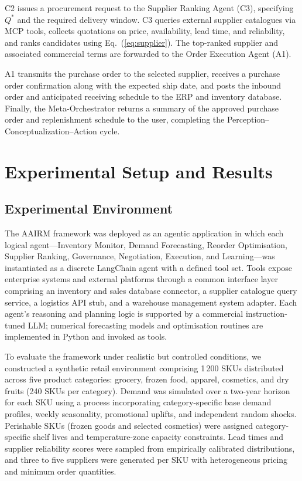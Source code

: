 \documentclass[utf8]{FrontiersinHarvard}
\begin{document}
	C2 issues a procurement request to the Supplier Ranking Agent (C3),
	specifying $Q^*$ and the required delivery window.  C3 queries external
	supplier catalogues via MCP tools, collects quotations on price,
	availability, lead time, and reliability, and ranks candidates using
	Eq.~(\ref{eq:supplier}).  The top-ranked supplier and associated commercial
	terms are forwarded to the Order Execution Agent (A1).

	A1 transmits the purchase order to the selected supplier, receives a
	purchase order confirmation along with the expected ship date, and posts
	the inbound order and anticipated receiving schedule to the ERP and
	inventory database.  Finally, the Meta-Orchestrator returns a summary of
	the approved purchase order and replenishment schedule to the user,
	completing the Perception--Conceptualization--Action cycle.

	\section{Experimental Setup and Results}
	\label{sec:impl}

	\subsection{Experimental Environment}

	The AAIRM framework was deployed as an agentic application in which each
	logical agent---Inventory Monitor, Demand Forecasting, Reorder Optimisation,
	Supplier Ranking, Governance, Negotiation, Execution, and Learning---was
	instantiated as a discrete LangChain agent with a defined tool set.  Tools
	expose enterprise systems and external platforms through a common interface
	layer comprising an inventory and sales database connector, a supplier
	catalogue query service, a logistics API stub, and a warehouse management
	system adapter.  Each agent's reasoning and planning logic is supported by
	a commercial instruction-tuned LLM; numerical forecasting models and
	optimisation routines are implemented in Python and invoked as tools.

	To evaluate the framework under realistic but controlled conditions, we
	constructed a synthetic retail environment comprising 1\,200 SKUs
	distributed across five product categories: grocery, frozen food, apparel,
	cosmetics, and dry fruits (240 SKUs per category).  Demand was simulated
	over a two-year horizon for each SKU using a process incorporating
	category-specific base demand profiles, weekly seasonality, promotional
	uplifts, and independent random shocks.  Perishable SKUs (frozen goods and
	selected cosmetics) were assigned category-specific shelf lives and
	temperature-zone capacity constraints.  Lead times and supplier reliability
	scores were sampled from empirically calibrated distributions, and three to
	five suppliers were generated per SKU with heterogeneous pricing and minimum
	order quantities.
\end{document}
